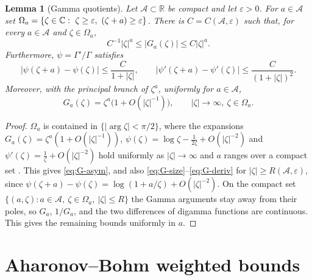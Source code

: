 \documentclass[11pt,a4paper,reqno,backref=page]{amsart}
\newcommand{\R}{\mathbb R}
\newcommand{\C}{\mathbb C}
\let\Re\relax\DeclareMathOperator{\Re}{Re}
\numberwithin{equation}{section}
\newtheorem{lemma}[theorem]{Lemma}
\theoremstyle{definition}
\theoremstyle{remark}
\begin{document}
\begin{lemma}[Gamma quotients]\label{lem:gamma}
  Let $\mathcal A\subset\R$ be compact and let $\varepsilon>0$.
  For $a\in\mathcal A$ set $\Omega_a=\{\zeta\in\C:\
  \Re\zeta\ge\varepsilon,\ \Re(\zeta+a)\ge\varepsilon\}$. There is
  $C=C(\mathcal A,\varepsilon)$ such that, for every $a\in\mathcal
  A$ and $\zeta\in\Omega_a$,
  \begin{equation}\label{eq:G-size}
    C^{-1}|\zeta|^a\le|G_a(\zeta)|\le C|\zeta|^a.
  \end{equation}
  Furthermore, $\psi=\Gamma'/\Gamma$ satisfies
  \begin{equation}\label{eq:G-deriv}
    |\psi(\zeta+a)-\psi(\zeta)|\le\frac C{1+|\zeta|},\qquad
    |\psi'(\zeta+a)-\psi'(\zeta)|\le\frac C{(1+|\zeta|)^2}.
  \end{equation}
  Moreover, with the principal branch
  of $\zeta^{a}$, uniformly for $a\in\mathcal A$,
  \begin{equation}\label{eq:G-asym}
    G_a(\zeta)=\zeta^a\bigl(1+O(|\zeta|^{-1})\bigr),\qquad
    |\zeta|\to\infty,\ \zeta\in\Omega_a.
  \end{equation}
\end{lemma}

\begin{proof}
$\Omega_a$ is contained in $\{|\arg\zeta|<\pi/2\}$, where the
expansions $G_a(\zeta)=\zeta^a(1+O(|\zeta|^{-1}))$,
$\psi(\zeta)=\log\zeta-\frac1{2\zeta} +O(|\zeta|^{-2})$ and
$\psi'(\zeta)=\frac1\zeta+O(|\zeta|^{-2})$ hold uniformly as
$|\zeta|\to\infty$ and $a$ ranges over a compact set
\cite[Eqs.~5.11.2, 5.11.12, 5.15.8]{NIST}. This gives
\eqref{eq:G-asym}, and also
\eqref{eq:G-size}--\eqref{eq:G-deriv} for $|\zeta|\ge R(\mathcal
A,\varepsilon)$, since
$\psi(\zeta+a)-\psi(\zeta)=\log(1+a/\zeta)+O(|\zeta|^{-2})$. On
the compact set $\{(a,\zeta):a\in\mathcal A,\ \zeta\in\Omega_a,\
|\zeta|\le R\}$ the Gamma arguments stay away from their poles,
so $G_a$, $1/G_a$, and the two differences of digamma functions
are continuous. This gives the remaining bounds uniformly in
$a$.
\end{proof}


\section{Aharonov--Bohm weighted bounds}
\label{sec:interior}
\end{document}
